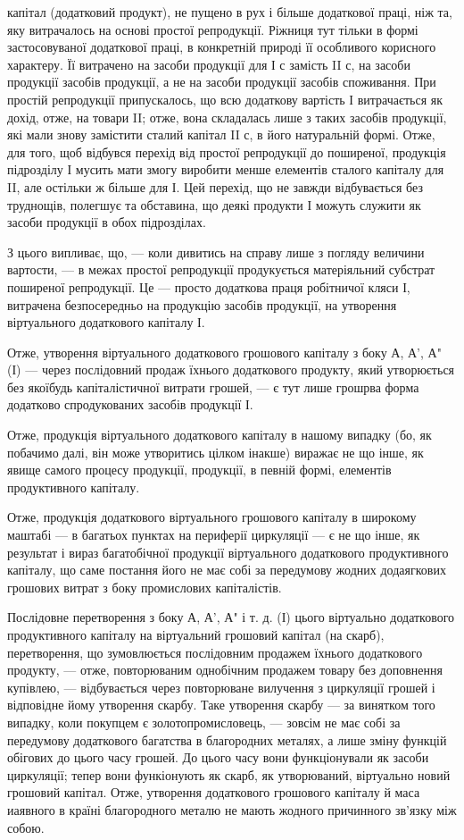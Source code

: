 капітал (додатковий продукт), не пущено в рух і більше додаткової праці,
ніж та, яку витрачалось на основі простої репродукції. Ріжниця тут
тільки в формі застосовуваної додаткової праці, в конкретній природі її
особливого корисного характеру. Її витрачено на засоби продукції для
І с замість II с, на засоби продукції засобів продукції, а не на засоби
продукції засобів споживання. При простій репродукції припускалось,
що всю додаткову вартість І витрачається як дохід, отже, на товари II;
отже, вона складалась лише з таких засобів продукції, які мали знову
замістити сталий капітал II с, в його натуральній формі. Отже, для того,
щоб відбувся перехід від простої репродукції до поширеної, продукція підрозділу
І мусить мати змогу виробити менше елементів сталого капіталу
для II, але остільки ж більше для І. Цей перехід, що не завжди відбувається
без труднощів, полегшує та обставина, що деякі продукти І
можуть служити як засоби продукції в обох підрозділах.

З цього випливає, що, — коли дивитись на справу лише з погляду величини
вартости, — в межах простої репродукції продукується матеріяльний
субстрат поширеної репродукції. Це — просто додаткова праця робітничої
кляси І, витрачена безпосередньо на продукцію засобів продукції, на утворення
віртуального додаткового капіталу І.

Отже, утворення віртуального додаткового грошового капіталу з боку
А, А', А" (І) — через послідовний продаж їхнього додаткового продукту,
який утворюється без якоїбудь капіталістичної витрати грошей, — є тут
лише грошрва форма додатково спродукованих засобів продукції І.

Отже, продукція віртуального додаткового капіталу в нашому випадку
(бо, як побачимо далі, він може утворитись цілком інакше) виражає не
що інше, як явище самого процесу продукції, продукції, в певній формі,
елементів продуктивного капіталу.

Отже, продукція додаткового віртуального грошового капіталу в широкому
маштабі — в багатьох пунктах на периферії циркуляції — є не що
інше, як результат і вираз багатобічної продукції віртуального додаткового
продуктивного капіталу, що саме постання його не має собі за передумову
жодних додаягкових грошових витрат з боку промислових капіталістів.

Послідовне перетворення з боку А, А', А" і т. д. (І) цього віртуально
додаткового продуктивного капіталу на віртуальний грошовий
капітал (на скарб), перетворення, що зумовлюється послідовним продажем
їхнього додаткового продукту, — отже, повторюваним однобічним продажем
товару без доповнення купівлею, — відбувається через повторюване
вилучення з циркуляції грошей і відповідне йому утворення скарбу. Таке
утворення скарбу — за винятком того випадку, коли покупцем є золотопромисловець,
— зовсім не має собі за передумову додаткового багатства
в благородних металях, а лише зміну функцій обігових до цього часу
грошей. До цього часу вони функціонували як засоби циркуляції; тепер
вони функіонують як скарб, як утворюваний, віртуально новий грошовий
капітал. Отже, утворення додаткового грошового капіталу й маса
иаявного в країні благородного металю не мають жодного причинного
зв'язку між собою.
